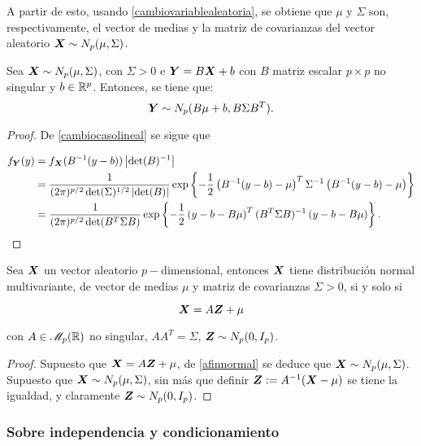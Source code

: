 A partir de esto, usando \ref{cambiovariablealeatoria}, se obtiene que $\mu$ y $\Sigma$ son, respectivamente, el vector de medias y la matriz de covarianzas del vector aleatorio $\boldsymbol{X} \sim N_p(\mu,\Sigma)$.


\begin{nprop} \label{afinnormal}
  Sea $\boldsymbol{X} \sim N_p(\mu,\Sigma)$, con $\Sigma > 0$ e $\boldsymbol{Y} = B\boldsymbol{X}+b$ con $B$ matriz escalar $p\times p$ no singular y $b\in\mathbb{R}^p$. Entonces, se tiene que:
  \[
     \boldsymbol{Y} \sim N_p(B\mu+b, B \Sigma B^T)
  .\]
\end{nprop}

\begin{proof}
  De \ref{cambiocasolineal} se sigue que

  \[
  \begin{split}
    f_{\boldsymbol{Y}}(y) & = f_{\boldsymbol{X}}(B^{-1}(y-b))\left|\det(B)^{-1}\right| \\
    & = \frac{1}{(2\pi)^{p/2} \det(\Sigma)^{1/2} \left|\det(B)\right|}
    \exp\left\{ -\frac{1}{2} \left(B^{-1}(y-b) - \mu\right)^T \Sigma^{-1} \left(B^{-1}(y-b) - \mu \right) \right\} \\
    & = \frac{1}{(2\pi)^{p/2} \det(B^T\Sigma B)}
    \exp\left\{ -\frac{1}{2} \left(y-b - B\mu\right)^T (B^T\Sigma B)^{-1} \left(y - b - B\mu \right) \right\}.
  \end{split}
  \]
\end{proof}

\begin{nth} \label{posvar:car-i}
  Sea $\boldsymbol{X}$ un vector aleatorio $p-$dimensional, entonces $\boldsymbol{X}$ tiene distribución normal multivariante, de vector de medias $\mu$ y matriz de covarianzas $\Sigma > 0$, si y solo si
  
  \[
    \boldsymbol{X} = A\boldsymbol{Z} + \mu
  \]
    
con $A\in \mathscr{M}_{p}(\mathbb{R})$ no singular, $AA^T = \Sigma$, $\boldsymbol{Z} \sim N_p(0,I_p)$.
\end{nth}

\begin{proof}
  Supuesto que $\boldsymbol{X} = A\boldsymbol{Z} + \mu$, de \ref{afinnormal} se deduce que $\boldsymbol{X} \sim N_p(\mu, \Sigma)$. Supuesto que $\boldsymbol{X} \sim N_p(\mu, \Sigma)$,
  sin más que definir $\boldsymbol{Z} := A^{-1}(\boldsymbol{X} - \mu)$ se tiene la igualdad, y claramente $\boldsymbol{Z} \sim N_p(0, I_p)$.
\end{proof}

\subsubsection{Sobre independencia y condicionamiento}

